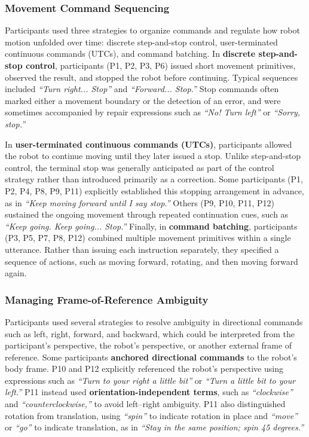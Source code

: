 \subsubsection{Movement Command Sequencing}
Participants used three strategies to organize commands and regulate how robot motion unfolded over time: discrete step-and-stop control, user-terminated continuous commands (UTCs), and command batching. In \textbf{discrete step-and-stop control}, participants (P1, P2, P3, P6) issued short movement primitives, observed the result, and stopped the robot before continuing. Typical sequences included \emph{``Turn right... Stop''} and \emph{``Forward... Stop.''} Stop commands often marked either a movement boundary or the detection of an error, and were sometimes accompanied by repair expressions such as \emph{``No! Turn left''} or \emph{``Sorry, stop.''}

In \textbf{user-terminated continuous commands (UTCs)}, participants allowed the robot to continue moving until they later issued a stop. Unlike step-and-stop control, the terminal stop was generally anticipated as part of the control strategy rather than introduced primarily as a correction. Some participants (P1, P2, P4, P8, P9, P11) explicitly established this stopping arrangement in advance, as in \emph{``Keep moving forward until I say stop.''} Others (P9, P10, P11, P12) sustained the ongoing movement through repeated continuation cues, such as \emph{``Keep going. Keep going... Stop.''} Finally, in \textbf{command batching}, participants (P3, P5, P7, P8, P12) combined multiple movement primitives within a single utterance. Rather than issuing each instruction separately, they specified a sequence of actions, such as moving forward, rotating, and then moving forward again.

\subsubsection{Managing Frame-of-Reference Ambiguity}
Participants used several strategies to resolve ambiguity in directional commands such as left, right, forward, and backward, which could be interpreted from the participant's perspective, the robot's perspective, or another external frame of reference. Some participants \textbf{anchored directional commands} to the robot's body frame. P10 and P12 explicitly referenced the robot's perspective using expressions such as \emph{``Turn to your right a little bit''} or \emph{``Turn a little bit to your left.''} P11 instead used \textbf{orientation-independent terms}, such as \emph{``clockwise''} and \emph{``counterclockwise,''} to avoid left--right ambiguity. P11 also distinguished rotation from translation, using \emph{``spin''} to indicate rotation in place and \emph{``move''} or \emph{``go''} to indicate translation, as in \emph{``Stay in the same position; spin 45 degrees.''}

